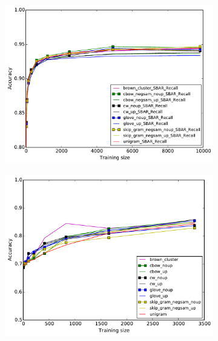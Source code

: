 \begin{figure}[h]
\caption{Chunking and MWE out-of-vocabulary-words accuracy for \textit{in-domain} test set}
\centering
\begin{subfigure}{7cm}
	\centering
    	\includegraphics[scale=.4]{plots/Chunking-OOV}
	\label{fig:inner}
\end{subfigure}
\begin{subfigure}{7cm}
	\centering
    	\includegraphics[scale=0.4]{plots/MWE-OOV}
	\label{fig:outner}
\end{subfigure}  	
\end{figure}	

